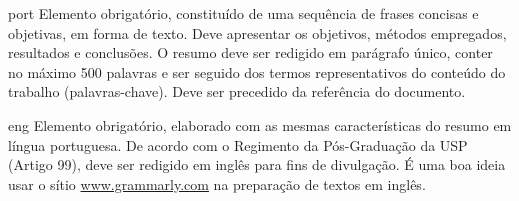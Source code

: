 
\begin{resumo}{port}
  Elemento obrigatório, constituído de uma sequência de frases concisas e
  objetivas, em forma de texto.  Deve apresentar os objetivos, métodos empregados,
  resultados e conclusões.  O resumo deve ser redigido em parágrafo único, conter
  no máximo 500 palavras e ser seguido dos termos representativos do conteúdo do
  trabalho (palavras-chave). Deve ser precedido da referência do documento.
  \end{resumo}
  
  \begin{resumo}{eng}
  Elemento obrigatório, elaborado com as mesmas características do resumo em
  língua portuguesa. De acordo com o Regimento da Pós-Graduação da USP (Artigo
  99), deve ser redigido em inglês para fins de divulgação. É uma boa ideia usar
  o sítio \url{www.grammarly.com} na preparação de textos em inglês.
  \end{resumo}
  